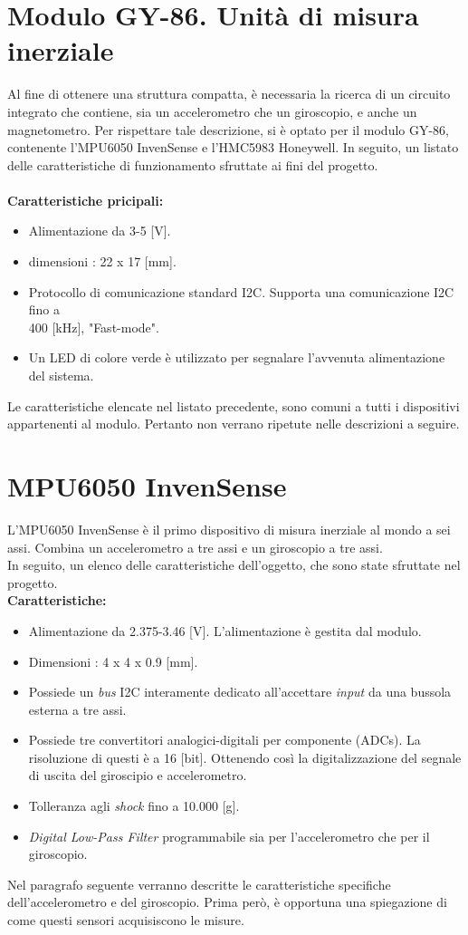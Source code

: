 \documentclass[11pt]{report}
\begin{document}
\section{Modulo GY-86. Unità di misura inerziale}
Al fine di ottenere una struttura compatta, è necessaria la ricerca di un circuito integrato che contiene, sia un accelerometro che un giroscopio, e anche un magnetometro. Per rispettare tale descrizione, si è optato per il modulo GY-86, contenente l'MPU6050 InvenSense e l'HMC5983 Honeywell.
In seguito, un listato delle caratteristiche di funzionamento sfruttate ai fini del progetto.\\\\
\textbf{Caratteristiche pricipali:}
\begin{itemize}
\item Alimentazione da 3-5 [V].
\item dimensioni : 22 x 17 [mm].
\item Protocollo di comunicazione standard I2C. Supporta una comunicazione I2C fino a\\400 [kHz], "Fast-mode".
\item Un LED di colore verde è utilizzato per segnalare l'avvenuta alimentazione del sistema.
\end{itemize}
Le caratteristiche elencate nel listato precedente, sono comuni a tutti i dispositivi appartenenti al modulo. Pertanto non verrano ripetute nelle descrizioni a seguire.
    \section{MPU6050 InvenSense}
    L'MPU6050 InvenSense è il primo dispositivo di misura inerziale al mondo a sei assi. Combina un accelerometro a tre assi e un giroscopio a tre assi.\\
    In seguito, un elenco delle caratteristiche dell'oggetto, che sono state sfruttate nel progetto.\\
    \textbf{Caratteristiche:}
    \begin{itemize}
    \item Alimentazione da 2.375-3.46 [V]. L'alimentazione è gestita dal modulo.
    \item Dimensioni : 4 x 4 x 0.9 [mm].
    \item Possiede un \textit{bus} I2C interamente dedicato all'accettare \textit{input} da una bussola esterna a  tre assi.  
    \item Possiede tre convertitori analogici-digitali per componente (ADCs). La risoluzione di questi è a 16 [bit]. Ottenendo così la digitalizzazione del segnale di uscita del giroscipio e accelerometro.
    \item Tolleranza agli \textit{shock} fino a 10.000 [g].
    \item \textit{Digital Low-Pass Filter} programmabile sia per l'accelerometro che per il giroscopio.
    \end{itemize}
Nel paragrafo seguente verranno descritte le caratteristiche specifiche dell'accelerometro e del giroscopio. Prima però, è opportuna una spiegazione di come questi sensori acquisiscono le misure.
\end{document}
